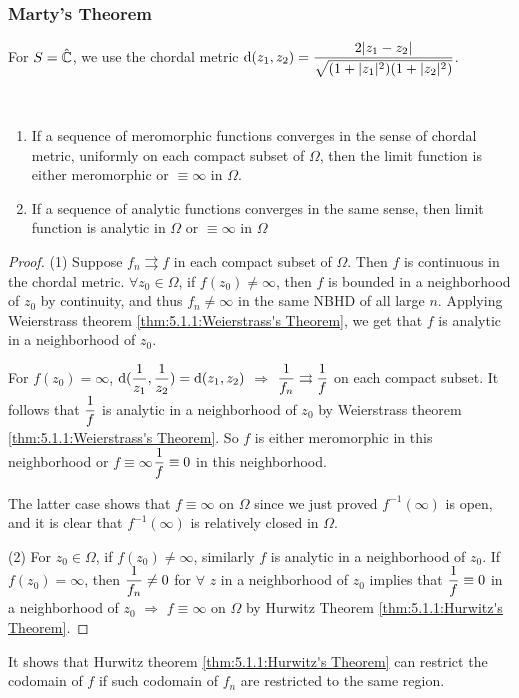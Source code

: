 \subsubsection{Marty's Theorem}
For  $ S=\hat{\mathbb C} $, we use the chordal metric  $ \mathrm{d}(z_1,z_2)=\displaystyle\frac{2|z_1-z_2|}{\sqrt{(1+|z_1|^2)(1+|z_2|^2)}} $.

\begin{lemma}\label{lemma:6.1.3:1}\,


    \begin{enumerate}[label=\arabic*]
        \item If a sequence of meromorphic functions converges in the sense of chordal metric, uniformly on each compact subset of  $ \Omega  $, then the limit function is either meromorphic  or  $ \equiv \infty $ in  $ \Omega  $.
        \item If a sequence of analytic functions converges in the same sense, then limit function is analytic  in  $ \Omega  $ or  $ \equiv \infty  $ in  $ \Omega $ 
    \end{enumerate}
\end{lemma}
\begin{proof}
    (1) Suppose  $ f_n\rightrightarrows f $ in each compact subset of  $ \Omega  $. Then  $ f  $ is continuous in the chordal metric.  $ \forall z_0\in \Omega  $, if  $ f(z_0)\neq \infty  $, then  $ f  $ is bounded in a neighborhood of  $ z_0  $  by continuity, and thus  $ f_n\neq \infty   $ in the same NBHD of all large  $ n $. Applying Weierstrass theorem \ref{thm:5.1.1:Weierstrass's Theorem}, we get that  $ f  $ is analytic in a neighborhood of  $ z_0 $.  

    For  $ f(z_0)=\infty $,  $ \mathrm{d}(\displaystyle\frac{1}{z_1},\frac{1}{z_2})=\mathrm{d}(z_1,z_2) $ $ \Rightarrow  $  $ \displaystyle\frac{1}{f_n}\rightrightarrows \frac{1}{f} $ on each compact subset. It follows that  $ \displaystyle\frac{1}{f} $ is analytic in a neighborhood of  $ z_0 $ by Weierstrass theorem \ref{thm:5.1.1:Weierstrass's Theorem}. So  $ f  $ is either  meromorphic in this neighborhood or  $ f\equiv \infty $\ie  $ \displaystyle\frac{1}{f}\equiv 0 $ in this neighborhood. 

    The latter case shows that  $ f\equiv \infty  $ on  $ \Omega  $ since  we just proved  $ f^{-1}(\infty ) $ is open, and it is clear that  $ f^{-1}(\infty) $ is relatively closed in  $ \Omega $. 

    (2) For  $ z_0\in \Omega  $, if  $ f(z_0)\neq \infty $, similarly  $ f  $ is analytic in a neighborhood of  $ z_0 $. If  $ f(z_0)=\infty $, then   $ \displaystyle\frac{1}{f_n}\neq 0 $ for  $ \forall $  $ z$ in a neighborhood of  $ z_0 $ implies that   $ \displaystyle\frac{1}{f}\equiv 0 $ in a neighborhood of  $ z_0 $ $ \Rightarrow $  $ f\equiv \infty $ on  $ \Omega $ by Hurwitz Theorem \ref{thm:5.1.1:Hurwitz's Theorem}.
\end{proof}
\begin{remark}
    It shows that Hurwitz theorem \ref{thm:5.1.1:Hurwitz's Theorem} can restrict the codomain of  $ f $ if such codomain of  $ f_n $ are restricted to the same region. 
\end{remark}

